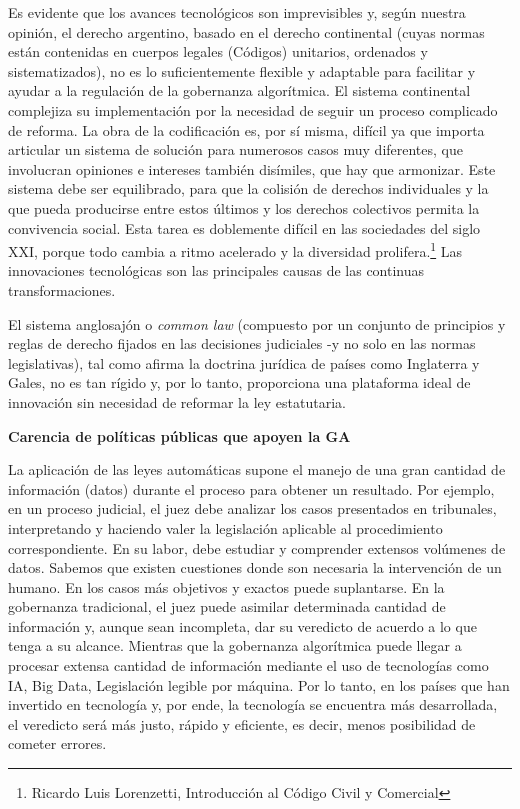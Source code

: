 \documentclass[12pt]{report} %
\begin{document}
Es evidente que los avances tecnológicos son imprevisibles y, según nuestra opinión, el derecho argentino, basado en el derecho continental (cuyas normas están contenidas en cuerpos legales (Códigos) unitarios, ordenados y sistematizados), no es lo suficientemente flexible y adaptable para facilitar y ayudar a la regulación de la gobernanza algorítmica. El sistema continental complejiza su implementación por la necesidad de seguir un proceso complicado de reforma. La obra de la codificación es, por sí misma, difícil ya que importa articular un sistema de solución para numerosos casos muy diferentes, que involucran opiniones e intereses también disímiles, que hay que armonizar. Este sistema debe ser equilibrado, para que la colisión de derechos individuales y la que pueda producirse entre estos últimos y los derechos colectivos permita la convivencia social.  Esta tarea es doblemente difícil en las sociedades del siglo XXI, porque todo cambia a ritmo acelerado y la diversidad prolifera.\footnote{Ricardo Luis Lorenzetti, Introducción al Código Civil y Comercial}  Las innovaciones tecnológicas son las principales causas de las continuas transformaciones.

El sistema anglosajón o \textit{common law} (compuesto por un conjunto de principios y reglas de derecho fijados en las decisiones judiciales -y no solo en las normas legislativas), tal como afirma la doctrina jurídica de países como Inglaterra y Gales, no es tan rígido y, por lo tanto, proporciona una plataforma ideal de innovación sin necesidad de reformar la ley estatutaria.

\textbf{Carencia de políticas públicas que apoyen la GA}

La aplicación de las leyes automáticas supone el manejo de una gran cantidad de información (datos) durante el proceso para obtener un resultado. Por ejemplo, en un proceso judicial, el juez debe analizar los casos presentados en tribunales, interpretando y haciendo valer la legislación aplicable al procedimiento correspondiente. En su labor, debe estudiar y comprender extensos volúmenes de datos. Sabemos que existen cuestiones donde son necesaria la intervención de un humano. En los casos más objetivos y exactos puede suplantarse. En la gobernanza tradicional, el juez puede asimilar determinada cantidad de información y, aunque sean incompleta, dar su veredicto de acuerdo a lo que tenga a su alcance. Mientras que la gobernanza algorítmica puede llegar a procesar extensa cantidad de información mediante el uso de tecnologías como IA, Big Data, Legislación legible por máquina. Por lo tanto, en los países que han invertido en tecnología y, por ende, la tecnología se encuentra más desarrollada, el veredicto será más justo, rápido y eficiente, es decir, menos posibilidad de cometer errores. 
\end{document}
